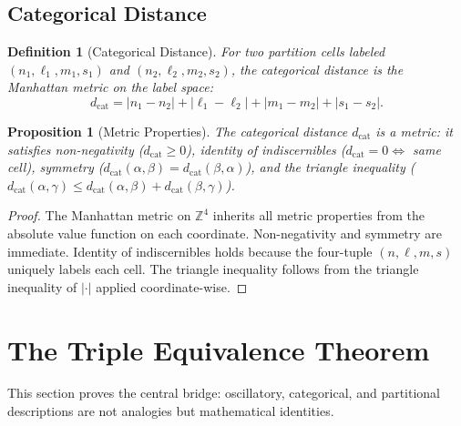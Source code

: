 \documentclass[11pt,twocolumn,a4paper]{article}
\newtheorem{proposition}[theorem]{Proposition}
\newtheorem{definition}[theorem]{Definition}
\newcommand{\Z}{\mathbb{Z}}
\newcommand{\dcat}{d_{\mathrm{cat}}}
\begin{document}
\subsection{Categorical Distance}

\begin{definition}[Categorical Distance]
\label{def:cat-distance}
For two partition cells labeled $(n_1, \ell_1, m_1, s_1)$ and
$(n_2, \ell_2, m_2, s_2)$, the categorical distance is the Manhattan
metric on the label space:
\begin{equation}
\dcat = |n_1 - n_2| + |\ell_1 - \ell_2|
  + |m_1 - m_2| + |s_1 - s_2|.
\label{eq:dcat}
\end{equation}
\end{definition}

\begin{proposition}[Metric Properties]
\label{prop:metric}
The categorical distance $\dcat$ is a metric: it satisfies
non-negativity ($\dcat \geq 0$), identity of indiscernibles
($\dcat = 0 \iff$ same cell), symmetry
($\dcat(\alpha,\beta) = \dcat(\beta,\alpha)$), and the triangle
inequality ($\dcat(\alpha,\gamma) \leq \dcat(\alpha,\beta) +
\dcat(\beta,\gamma)$).
\end{proposition}

\begin{proof}
The Manhattan metric on $\Z^4$ inherits all metric properties from
the absolute value function on each coordinate. Non-negativity and
symmetry are immediate. Identity of indiscernibles holds because
the four-tuple $(n,\ell,m,s)$ uniquely labels each cell. The triangle
inequality follows from the triangle inequality of $|\cdot|$ applied
coordinate-wise.
\end{proof}


\section{The Triple Equivalence Theorem}
\label{sec:triple}

This section proves the central bridge: oscillatory, categorical, and
partitional descriptions are not analogies but mathematical identities.
\end{document}
